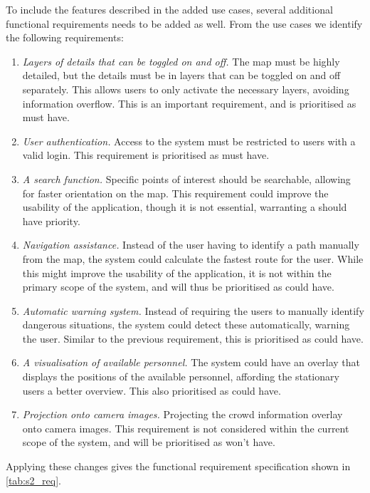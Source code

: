 To include the features described in the added use cases, several additional functional requirements needs to be added as well. From the use cases we identify the following requirements:

\begin{enumerate}[resume]
    \item \emph{Layers of details that can be toggled on and off.} The map must be highly detailed, but the details must be in layers that can be toggled on and off separately. This allows users to only activate the necessary layers, avoiding information overflow. This is an important requirement, and is prioritised as must have.
    \item \emph{User authentication.} Access to the system must be restricted to users with a valid login. This requirement is prioritised as must have.
    \item \emph{A search function.} Specific points of interest should be searchable, allowing for faster orientation on the map. This requirement could improve the usability of the application, though it is not essential, warranting a should have priority.
    \item \emph{Navigation assistance.} Instead of the user having to identify a path manually from the map, the system could calculate the fastest route for the user. While this might improve the usability of the application, it is not within the primary scope of the system, and will thus be prioritised as could have.
    \item \emph{Automatic warning system.} Instead of requiring the users to manually identify dangerous situations, the system could detect these automatically, warning the user. Similar to the previous requirement, this is prioritised as could have.
    \item \emph{A visualisation of available personnel.} The system could have an overlay that displays the positions of the available personnel, affording the stationary users a better overview. This also prioritised as could have.
    \item \emph{Projection onto camera images.} Projecting the crowd information overlay onto camera images. This requirement is not considered within the current scope of the system, and will be prioritised as won't have.
\end{enumerate}

Applying these changes gives the functional requirement specification shown in \cref{tab:s2_req}.


